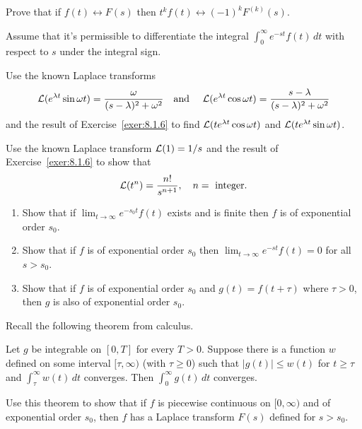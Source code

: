\documentclass{ximera}
\begin{document}
\begin{problem}\label{exer:8.1.6}
Prove that if $f(t)\leftrightarrow F(s)$ then $t^kf(t)\leftrightarrow
(-1)^kF^{(k)}(s)$.

\begin{hint}
    Assume that it's permissible to differentiate
the integral $\int_0^\infty e^{-st}f(t)\,dt$ with respect to $s$ under
the integral sign.
\end{hint}
\end{problem}

\begin{problem}\label{exer:8.1.7}
Use the known Laplace transforms
$$
{\cal L}(e^{\lambda t}\sin\omega t)=\frac{\omega}{(s-\lambda)^2+\omega^2}
\quad\text{and }\quad
{\cal L}(e^{\lambda t}\cos\omega t)=\frac{s-\lambda}{(s-\lambda)^2+\omega^2}
$$
  and the result of Exercise~\ref{exer:8.1.6} to find
${\cal L}(te^{\lambda t}\cos\omega t)$ and
${\cal L}(te^{\lambda t}\sin\omega t)$.
\end{problem}

\begin{problem}\label{exer:8.1.8}
 Use the known Laplace transform ${\cal L}(1)=1/s$ and the result of
Exercise~\ref{exer:8.1.6} to show that
$$
{\cal L}(t^n)=\frac{n!}{s^{n+1}},\quad n=\text{ integer}.
$$
\end{problem}

\begin{problem}\label{exer:8.1.9}
\begin{enumerate}
\item %
 Show that if $\lim_{t\to\infty} e^{-s_0t} f(t)$ exists and
is finite then  $f$ is of exponential order $s_0$.
\item %
 Show that if $f$ is of exponential order $s_0$ then $\lim_{t
\to\infty} e^{-st} f(t)=0$ for all $s>s_0$.
\item %
Show that if $f$ is of exponential order $s_0$  and $g(t)=f(t+\tau)$
where $\tau>0$, then $g$ is also of exponential order $s_0$.
\end{enumerate}
\end{problem}

\begin{problem}\label{exer:8.1.10}
Recall the following theorem from calculus.

\begin{theorem}
    Let $g$ be integrable on $[0,T]$ for
every $T>0.$  Suppose there is a function $w$ defined on some
interval $[\tau,\infty)$ (with $\tau\ge 0$) such that $|g(t)|\le
w(t)$ for $t\ge\tau$ and $\int^\infty_\tau w(t)\,dt$
converges.  Then $\int_0^\infty g(t)\,dt$ converges.
\end{theorem} 

Use this theorem to show that if $f$ is piecewise continuous on
$[0,\infty)$ and of exponential order $s_0$, then $f$ has a Laplace
transform $F(s)$ defined for $s>s_0$.
\end{problem}
\end{document}
